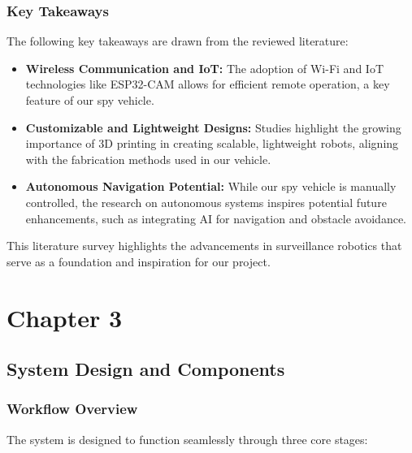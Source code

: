 \documentclass[12pt,a4paper]{report}
\begin{document}
\subsection{Key Takeaways}
The following key takeaways are drawn from the reviewed literature:

\begin{itemize}
    \item \textbf{Wireless Communication and IoT:} The adoption of Wi-Fi and IoT technologies like ESP32-CAM allows for efficient remote operation, a key feature of our spy vehicle.
    \item \textbf{Customizable and Lightweight Designs:} Studies highlight the growing importance of 3D printing in creating scalable, lightweight robots, aligning with the fabrication methods used in our vehicle.
    \item \textbf{Autonomous Navigation Potential:} While our spy vehicle is manually controlled, the research on autonomous systems inspires potential future enhancements, such as integrating AI for navigation and obstacle avoidance.
\end{itemize}

This literature survey highlights the advancements in surveillance robotics that serve as a foundation and inspiration for our project.






	{\vfill \chapter*{\centering \vfill Chapter 3 \vfill}\vfill}
	\thispagestyle{empty}
	\newpage
	\label{System Design and Components}
	\section{System Design and Components}
	\subsection{Workflow Overview}

The system is designed to function seamlessly through three core stages:
\end{document}
